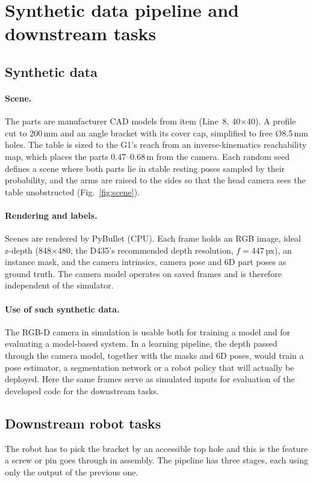 \documentclass[10pt,a4paper]{article}
\begin{document}
\section{Synthetic data pipeline and downstream tasks}
\label{sec:pipeline}
\subsection{Synthetic data}
\paragraph{Scene.} The parts are manufacturer CAD models from item (Line~8, 40$\times$40). A profile cut to
200\,mm and an angle bracket with its cover cap, simplified to free \O8.5\,mm holes. The table is sized to the
G1's reach from an inverse-kinematics reachability map, which places the parts 0.47--0.68\,m from the camera.
Each random seed defines a scene where both parts lie in stable resting poses sampled by their probability, and the
arms are raised to the sides so that the head camera sees the table unobstructed (Fig.~\ref{fig:scene}).

\paragraph{Rendering and labels.} Scenes are rendered by PyBullet (CPU). Each frame holds an RGB image, ideal z-depth
(848$\times$480, the D435's recommended depth resolution, $f = 447$\,px), an instance mask, and the camera
intrinsics, camera pose and 6D part poses as ground truth. The camera model operates on saved frames and is
therefore independent of the simulator.

\paragraph{Use of such synthetic data.} The RGB-D camera in simulation is usable both for training a model and for evaluating a model-based system. In a
learning pipeline, the depth passed through the camera model, together with the masks and 6D poses, would
train a pose estimator, a segmentation network or a robot policy that will actually be deployed. Here
the same frames serve as simulated inputs for evaluation of the developed code for the downstream tasks.

\subsection{Downstream robot tasks}
The robot has to pick the bracket by an accessible top hole and this is the feature a screw or
pin goes through in assembly. The pipeline has three stages, each using only the
output of the previous one.
\end{document}
